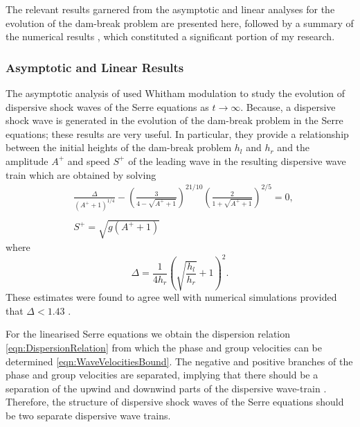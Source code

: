 The relevant results garnered from the asymptotic \cite{El-etal-2006} and linear \cite{Dougalis-etal-2007} analyses for the evolution of the dam-break problem are presented here, followed by a summary of the numerical results \cite{Pitt-2018-61}, which constituted a significant portion of my research. 

\subsubsection{Asymptotic and Linear Results}
The asymptotic analysis of \citet{El-etal-2006} used Whitham modulation to study the evolution of dispersive shock waves of the Serre equations as $t\rightarrow \infty$. Because, a dispersive shock wave is generated in the evolution of the dam-break problem in the Serre equations; these results are very useful. In particular, they provide a relationship between the initial heights of the dam-break problem $h_l$ and $h_r$ and the amplitude $A^+$ and speed $S^+$ of the leading wave in the resulting dispersive wave train which are obtained by solving
\begin{subequations}
	\begin{align}
	&\frac{\Delta}{\left(A^+ + 1\right)^{1/4}} - \left(\frac{3}{4 -  \sqrt{A^+ + 1}}\right)^{21/10} \left(\frac{2}{1 + \sqrt{A^+ + 1}}\right)^{2/5} = 0,	\label{eqn:Aplusdef} \\  \nonumber \\
	&S^+ = \sqrt{g \left(A^+ + 1\right)}	\label{eqn:Splusdef}
	\end{align}
	\label{eqn:ELWhitMod}	
\end{subequations}
where
\begin{equation*}
\Delta = \frac{1}{4 h_r}\left(\sqrt{\dfrac{h_l}{h_r}} + 1\right)^2.
\end{equation*}
These estimates were found to agree well with numerical simulations provided that $\Delta < 1.43$ \cite{El-etal-2006}.

For the linearised Serre equations we obtain the dispersion relation \eqref{eqn:DispersionRelation} from which the phase and group velocities can be determined \eqref{eqn:WaveVelocitiesBound}. The negative and positive branches of the phase and group velocities are separated, implying that there should be a separation of the upwind and downwind parts of the dispersive wave-train \citet{Dougalis-etal-2007}. Therefore, the structure of dispersive shock waves of the Serre equations should be two separate dispersive wave trains.


